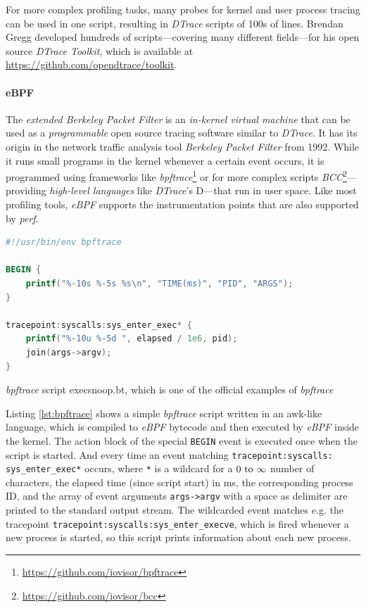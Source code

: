     For more complex profiling tasks, many probes for kernel and user process tracing can be used in one script, resulting in \textit{DTrace} scripts of 100s of lines. Brendan Gregg developed hundreds of scripts---covering many different fields---for his open source \emph{DTrace Toolkit}, which is available at \url{https://github.com/opendtrace/toolkit}.

\paragraph{eBPF}

    The \textit{extended Berkeley Packet Filter} is an \emph{in-kernel virtual machine} that can be used as a \emph{programmable} open source tracing software similar to \textit{DTrace}. It has its origin in the network traffic analysis tool \textit{Berkeley Packet Filter} from 1992. While it runs small programs in the kernel whenever a certain event occurs, it is programmed using frameworks like \textit{bpftrace}\footnote{\url{https://github.com/iovisor/bpftrace}} or for more complex scripts \textit{BCC}\footnote{\url{https://github.com/iovisor/bcc}}---providing \emph{high-level languages} like \textit{DTrace}'s D---that run in user space. Like most profiling tools, \textit{eBPF} supports the instrumentation points that are also supported by \textit{perf}.

\begin{@empty}
    \begin{code}[h!]
        \begin{lstlisting}[language = awk]
#!/usr/bin/env bpftrace

BEGIN {
    printf("%-10s %-5s %s\n", "TIME(ms)", "PID", "ARGS");
}

tracepoint:syscalls:sys_enter_exec* {
    printf("%-10u %-5d ", elapsed / 1e6, pid);
    join(args->argv);
}
        \end{lstlisting}
        \caption[bpftrace script example]{\textit{bpftrace} script execsnoop.bt, which is one of the official examples of \textit{bpftrace}}
        \label{lst:bpftrace}
    \end{code}
\end{@empty}

    Listing \ref{lst:bpftrace} shows a simple \textit{bpftrace} script written in an awk-like language, which is compiled to \textit{eBPF} bytecode and then executed by \textit{eBPF} inside the kernel. The action block of the special \lstinline|BEGIN| event is executed once when the script is started. And every time an event matching \lstinline|tracepoint:syscalls: sys_enter_exec*| occurs, where \lstinline|*| is a wildcard for a $\numrange[parse-numbers = false]{0}{\infty}$ number of characters, the elapsed time (since script start) in \si{\milli\second}, the corresponding process ID, and the array of event arguments \lstinline|args->argv| with a space as delimiter are printed to the standard output stream. The wildcarded event matches e.g. the tracepoint \lstinline|tracepoint:syscalls:sys_enter_execve|, which is fired whenever a new process is started, so this script prints information about each new process.

